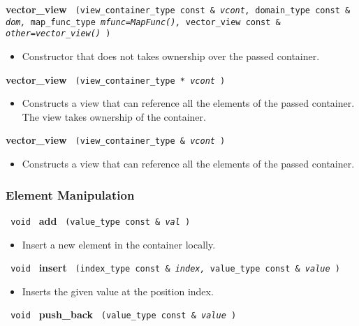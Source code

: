 \noindent
\textbf{vector\_view}%
\texttt{%
(view\_container\_type const \&
\textit{vcont,}%
domain\_type const \&
\textit{dom,}%
map\_func\_type
\textit{mfunc=MapFunc(),}%
vector\_view const \&
\textit{other=vector\_view()}%
)
}

\begin{itemize}
\item
Constructor that does not takes ownership over the passed container.
\end{itemize}

\noindent
\textbf{vector\_view}%
\texttt{%
(view\_container\_type *
\textit{vcont}%
)
}

\begin{itemize}
\item
Constructs a view that can reference all the elements of the passed container. The view takes ownership of the container.
\end{itemize}

\noindent
\textbf{vector\_view}%
\texttt{%
(view\_container\_type \&
\textit{vcont}%
)
}

\begin{itemize}
\item
Constructs a view that can reference all the elements of the passed container.
\end{itemize}

\subsubsection{ Element Manipulation}

\noindent
\texttt{%
void
}
\newline
\textbf{add}%
\texttt{%
(value\_type const \&
\textit{val}%
)
}

\begin{itemize}
\item
Insert a new element in the container locally.
\end{itemize}

\noindent
\texttt{%
void
}
\newline
\textbf{insert}%
\texttt{%
(index\_type const \&
\textit{index,}%
value\_type const \&
\textit{value}%
)
}

\begin{itemize}
\item
Inserts the given value at the position index.
\end{itemize}

\noindent
\texttt{%
void
}
\newline
\textbf{push\_back}%
\texttt{%
(value\_type const \&
\textit{value}%
)
}

